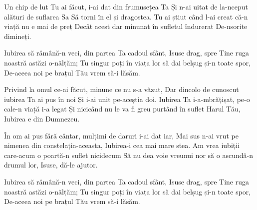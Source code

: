 \beginverse
Un chip de lut Tu ai făcut, i-ai dat din frumusețea Ta
Și n-ai uitat de la-nceput alături de suflarea Sa
Să torni în el și dragostea.
Tu ai știut când l-ai creat că-n viață nu e mai de preț
Decât acest dar minunat în sufletul îndurerat
De-nsorite dimineți.
\endverse

\beginchorus
Iubirea să rămână-n veci, din partea Ta cadoul sfânt,
Isuse drag, spre Tine ruga noastră astăzi o-nălțăm;
Tu singur poți în viața lor să dai belșug și-n toate spor,
De-aceea noi pe brațul Tău vrem să-i lăsăm.
\endchorus

\beginverse
Privind la omul ce-ai făcut, minune ce nu s-a văzut,
Dar dincolo de cunoscut iubirea Ta ai pus în noi
Și i-ai unit pe-aceștia doi.
Iubirea Ta i-a-mbrățișat, pe-o cale-n viață i-a legat
Și nicicând nu le va fi greu purtând în suflet Harul Tău,
Iubirea e din Dumnezeu.
\endverse

\beginverse
În om ai pus fără cântar, mulțimi de daruri i-ai dat iar,
Mai sus n-ai vrut pe nimenea din constelația-aceasta,
Iubirea-i cea mai mare stea.
Am vrea iubiții care-acum o poartă-n suflet nicidecum
Să nu dea voie vreunui nor să o ascundă-n drumul lor,
Isuse, dă-le ajutor.
\endverse

\beginverse*
Iubirea să rămână-n veci, din partea Ta cadoul sfânt,
Isuse drag, spre Tine ruga noastră astăzi o-nălțăm;
Tu singur poți în viața lor să dai belșug și-n toate spor,
De-aceea noi pe brațul Tău vrem să-i lăsăm.
\endverse
\endsong